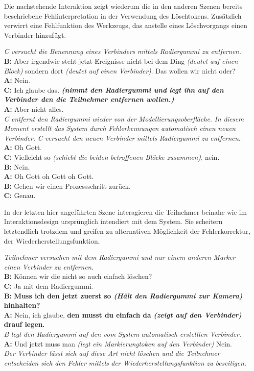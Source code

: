 Die nachstehende Interaktion zeigt wiederum die in den anderen Szenen bereits beschriebene Fehlinterpretation in der Verwendung des Löschtokens. Zusätzlich verwirrt eine Fehlfunktion des Werkzeugs, das anstelle eines Löschvorgangs einen Verbinder hinzufügt.

\begin{transkript}
	\emph{C versucht die Benennung eines Verbinders mittels Radiergummi zu entfernen.}\\
	\textbf{B:} Aber irgendwie steht jetzt Ereignisse nicht bei dem Ding \emph{(deutet auf einen Block)} sondern dort \emph{(deutet auf einen Verbinder)}. Das wollen wir nicht oder?\\
	\textbf{A:} Nein.\\
	\textbf{C:} Ich glaube das. \emph{\textbf{(nimmt den Radiergummi und legt ihn auf den Verbinder den die Teilnehmer entfernen wollen.)}}\\
	\textbf{A:} Aber nicht alles.\\
	\emph{C entfernt den Radiergummi wieder von der Modellierungsoberfläche. In diesem Moment erstellt das System durch Fehlerkennungen automatisch einen neuen Verbinder. C versucht den neuen Verbinder mittels Radiergummi zu entfernen.}\\
	\textbf{A:} Oh Gott.\\
	\textbf{C:} Vielleicht so \emph{(schiebt die beiden betroffenen Blöcke zusammen)}, nein.\\
	\textbf{B:} Nein.\\
	\textbf{A:} Oh Gott oh Gott oh Gott.\\
	\textbf{B:} Gehen wir einen Prozessschritt zurück.\\
	\textbf{C:} Genau.\\
\end{transkript}

In der letzten hier angeführten Szene interagieren die Teilnehmer beinahe wie im Interaktionsdesign ursprünglich intendiert mit dem System. Sie scheitern letztendlich trotzdem und greifen zu alternativen Möglichkeit der Fehlerkorrektur, der Wiederherstellungsfunktion.

\begin{transkript}
	\emph{Teilnehmer versuchen mit dem Radiergummi und nur einem anderen Marker einen Verbinder zu entfernen.}\\
	\textbf{B:} Können wir die nicht so auch einfach löschen?\\
	\textbf{C:} Ja mit dem Radiergummi.\\
	\textbf{B:} \textbf{Muss ich den jetzt zuerst so \emph{(Hält den Radiergummi zur Kamera)} hinhalten?}\\
	\textbf{A:} Nein, ich glaube, \textbf{den musst du einfach da \emph{(zeigt auf den Verbinder)} drauf legen.}\\
	\emph{B legt den Radiergummi auf den vom System automatisch erstellten Verbinder.}\\
	\textbf{A:} Und jetzt muss man \emph{(legt ein Markierungtoken auf den Verbinder)} Nein.\\
	\emph{Der Verbinder lässt sich auf diese Art nicht löschen und die Teilnehmer entscheiden sich den Fehler mittels der Wiederherstellungsfunktion zu beseitigen.}
\end{transkript}

